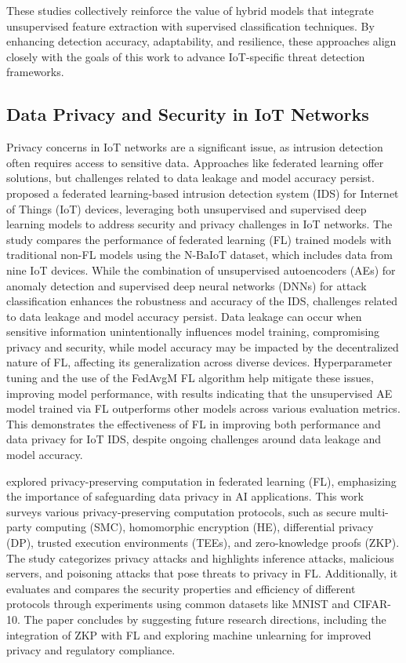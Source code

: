 These studies collectively reinforce the value of hybrid models that integrate unsupervised feature extraction with supervised classification techniques. By enhancing detection accuracy, adaptability, and resilience, these approaches align closely with the goals of this work to advance IoT-specific threat detection frameworks.
\subsection{Data Privacy and Security in IoT Networks}

Privacy concerns in IoT networks are a significant issue, as intrusion detection often requires access to sensitive data. Approaches like federated learning offer solutions, but challenges related to data leakage and model accuracy persist. \citet{olanrewaju2025federated} proposed a federated learning-based intrusion detection system (IDS) for Internet of Things (IoT) devices, leveraging both unsupervised and supervised deep learning models to address security and privacy challenges in IoT networks. The study compares the performance of federated learning (FL) trained models with traditional non-FL models using the N-BaIoT dataset, which includes data from nine IoT devices. While the combination of unsupervised autoencoders (AEs) for anomaly detection and supervised deep neural networks (DNNs) for attack classification enhances the robustness and accuracy of the IDS, challenges related to data leakage and model accuracy persist. Data leakage can occur when sensitive information unintentionally influences model training, compromising privacy and security, while model accuracy may be impacted by the decentralized nature of FL, affecting its generalization across diverse devices. Hyperparameter tuning and the use of the FedAvgM FL algorithm help mitigate these issues, improving model performance, with results indicating that the unsupervised AE model trained via FL outperforms other models across various evaluation metrics. This demonstrates the effectiveness of FL in improving both performance and data privacy for IoT IDS, despite ongoing challenges around data leakage and model accuracy.

\citet{chen2024federated} explored privacy-preserving computation in federated learning (FL), emphasizing the importance of safeguarding data privacy in AI applications. This work surveys various privacy-preserving computation protocols, such as secure multi-party computing (SMC), homomorphic encryption (HE), differential privacy (DP), trusted execution environments (TEEs), and zero-knowledge proofs (ZKP). The study categorizes privacy attacks and highlights inference attacks, malicious servers, and poisoning attacks that pose threats to privacy in FL. Additionally, it evaluates and compares the security properties and efficiency of different protocols through experiments using common datasets like MNIST and CIFAR-10. The paper concludes by suggesting future research directions, including the integration of ZKP with FL and exploring machine unlearning for improved privacy and regulatory compliance.

